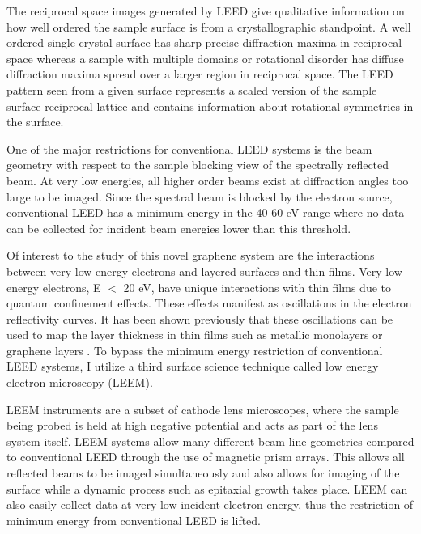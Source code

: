 The reciprocal space images generated by LEED give qualitative information on how well ordered the sample surface is from a crystallographic standpoint. A well ordered single crystal surface has sharp precise diffraction maxima in reciprocal space whereas a sample with multiple domains or rotational disorder has diffuse diffraction maxima spread over a larger region in reciprocal space. The LEED pattern seen from a given surface represents a scaled version of the sample surface reciprocal lattice and contains information about rotational symmetries in the surface.

One of the major restrictions for conventional LEED systems is the beam geometry with respect to the sample blocking view of the spectrally reflected beam. At very low energies, all higher order beams exist at diffraction angles too large to be imaged. Since the spectral beam is blocked by the electron source, conventional LEED has a minimum energy in the 40-60 eV range where no data can be collected for incident beam energies lower than this threshold.

Of interest to the study of this novel graphene system are the interactions between very low energy electrons and layered surfaces and thin films. Very low energy electrons, E $<$ 20 eV, have unique interactions with thin films due to quantum confinement effects. These effects manifest as oscillations in the electron reflectivity curves. It has been shown previously that these oscillations can be used to map the layer thickness in thin films such as metallic monolayers or graphene layers \cite{Hannon-LEEM-Book}. To bypass the minimum energy restriction of conventional LEED systems, I utilize a third surface science technique called low energy electron microscopy (LEEM).

LEEM instruments are a subset of cathode lens microscopes, where the sample being probed is held at high negative potential and acts as part of the lens system itself. LEEM systems allow many different beam line geometries compared to conventional LEED through the use of magnetic prism arrays. This allows all reflected beams to be imaged simultaneously and also allows for imaging of the surface while a dynamic process such as epitaxial growth takes place. LEEM can also easily collect data at very low incident electron energy, thus the restriction of minimum energy from conventional LEED is lifted.


